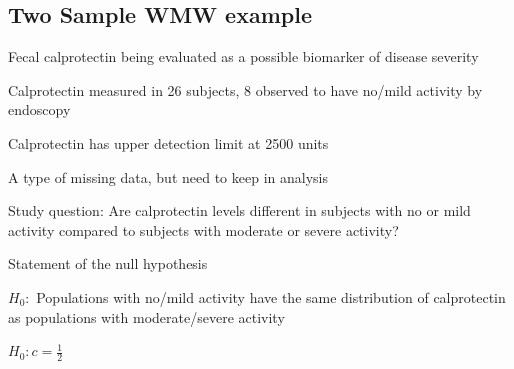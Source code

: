 \subsection{Two Sample WMW example}\label{sec:calprotectin}
\bi 
\item Fecal calprotectin being evaluated as a possible biomarker of
  disease severity 
\item Calprotectin measured in 26 subjects, 8 observed to have no/mild
  activity by endoscopy 
\item Calprotectin has upper detection limit at 2500 units
 \bi 
 \item A type of missing data, but need to keep in analysis
 \ei
\item Study question: Are calprotectin levels different in subjects
  with no or mild activity compared to subjects with moderate or
  severe activity? 
\item Statement of the null hypothesis
 \bi 
 \item $H_0:$ Populations with no/mild activity have the same
   distribution of calprotectin as populations with moderate/severe
   activity 
 \item $H_0: c = \frac{1}{2}$
 \ei
\ei
